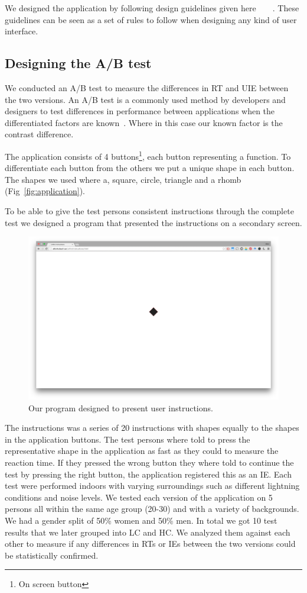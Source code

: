 \documentclass[runningheads,a4paper]{llncs}
\begin{document}
We designed the application by following design guidelines given here~\cite{hoober2011designing}~\cite{johnson2013designing}~\cite{gong2004guidelines}~\cite{norman2013design}. These guidelines can be seen as a set of rules to follow when designing any kind of user interface. 

\subsection{Designing the A/B test}
We conducted an A/B test to measure the differences in RT and UIE between the two versions. An A/B test is a commonly used method by developers and designers to test differences in performance between applications when the differentiated factors are known~\cite{johnson2013designing}. Where in this case our known factor is the contrast difference. 

The application consists of 4 buttons\footnote{On screen button}, each button representing a function. To differentiate each button from the others we put a unique shape in each button. The shapes we used where a, square, circle, triangle and a rhomb (Fig~\ref{fig:application}).

To be able to give the test persons consistent instructions through the complete test we designed a program that presented the instructions on a secondary screen. 
\begin{figure}
	\centering
	\includegraphics[width=\textwidth]{instructions}
	\caption{Our program designed to present user instructions.
	\label{fig:instructions}}
\end{figure}
The instructions was a series of 20 instructions with shapes equally to the shapes in the application buttons. The test persons where told to press the representative shape in the application as fast as they could to measure the reaction time. If they pressed the wrong button they where told to continue the test by pressing the right button, the application registered this as an IE. Each test were performed indoors with varying surroundings such as different lightning conditions and noise levels. We tested each version of the application on 5 persons all within the same age group (20-30) and with a variety of backgrounds. We had a gender split of 50\% women and 50\% men. In total we got 10 test results that we later grouped into LC and HC. We analyzed them against each other to measure if any differences in RTs or IEs between the two versions could be statistically confirmed.
\end{document}
